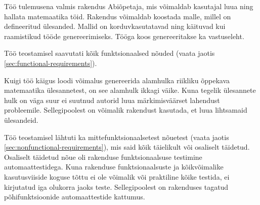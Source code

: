 Töö tulemusena valmis rakendus Abiõpetaja, mis võimaldab kasutajal luua ning hallata matemaatika töid. Rakendus võimaldab koostada malle, millel on defineeritud ülesanded. Mallid on korduvkasutatavad ning käituvad kui raamistikud tööde genereerimiseks. Tööga koos genereeritakse ka vastuseleht.

Töö teostamisel saavutati kõik funktsionaalsed nõuded (vaata jaotis \ref{sec:functional-requirements}).

Kuigi töö käigus loodi võimalus genereerida alamhulka riikliku õppekava matemaatika ülesannetest, on see alamhulk ikkagi väike. Kuna tegelik ülesannete hulk on väga suur ei suutnud autorid luua märkimisväärset lahendust probleemile. Sellegipoolest on võimalik rakendust kasutada, et luua lihtsamaid ülesandeid.

Töö teostamisel lähtuti ka mittefunktsionaalsetest nõuetest (vaata jaotis \ref{sec:nonfunctional-requirements}), mis said kõik täielikult või osaliselt täidetud. Osaliselt täidetud nõue oli rakenduse funktsionaalsuse testimine automaattestidega. Kuna rakenduse funktsionaalsuste ja kõikvõimalike kasutusviiside koguse tõttu ei ole võimalik või praktiline kõike testida, ei kirjutatud iga olukorra jaoks teste. Sellegipoolest on rakenduses tagatud põhifunktsioonide automaattestide kattumus.
